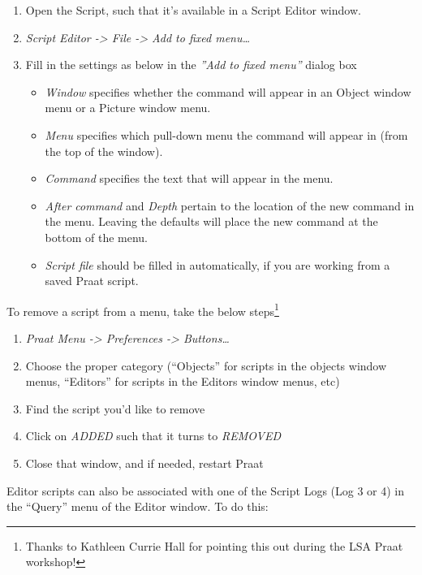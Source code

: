 \documentclass[11pt]{article}
\def\tightlist{}
\begin{document}
\begin{enumerate}
\def\labelenumi{\arabic{enumi}.}
\tightlist
\item
  Open the Script, such that it's available in a Script Editor window.
\item
  \emph{Script Editor -\textgreater{} File -\textgreater{} Add to fixed
  menu\ldots{}}
\item
  Fill in the settings as below in the \emph{''Add to fixed menu''}
  dialog box

  \begin{itemize}
  \tightlist
  \item
    \emph{Window} specifies whether the command will appear in an Object
    window menu or a Picture window menu.
  \item
    \emph{Menu} specifies which pull-down menu the command will appear
    in (from the top of the window).
  \item
    \emph{Command} specifies the text that will appear in the menu.
  \item
    \emph{After command} and \emph{Depth} pertain to the location of the
    new command in the menu. Leaving the defaults will place the new
    command at the bottom of the menu.
  \item
    \emph{Script file} should be filled in automatically, if you are
    working from a saved Praat script.
  \end{itemize}
\end{enumerate}

To remove a script from a menu, take the below
steps\footnote{Thanks to Kathleen Currie Hall for pointing this out during the LSA Praat workshop!}

\begin{enumerate}
\def\labelenumi{\arabic{enumi}.}
\tightlist
\item
  \emph{Praat Menu -\textgreater{} Preferences -\textgreater{}
  Buttons\ldots{}}
\item
  Choose the proper category (``Objects'' for scripts in the objects
  window menus, ``Editors'' for scripts in the Editors window menus,
  etc)
\item
  Find the script you'd like to remove
\item
  Click on \emph{ADDED} such that it turns to \emph{REMOVED}
\item
  Close that window, and if needed, restart Praat
\end{enumerate}

Editor scripts can also be associated with one of the Script Logs (Log 3
or 4) in the ``Query'' menu of the Editor window. To do this:
\end{document}
